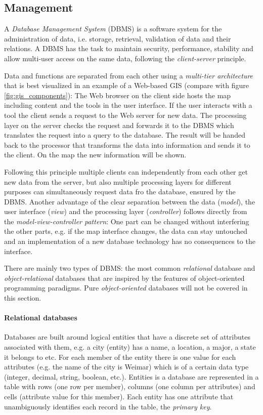

\subsection{Management} %
\label{ssub:management}

A \emph{Database Management System} (DBMS) is a software system for the administration of data, i.e. storage, retrieval, validation of data and their relations. A DBMS has the task to maintain security, performance, stability and allow multi-user access on the same data, following the \emph{client-server} principle.

Data and functions are separated from each other using a \emph{multi-tier architecture} that is best visualized in an example of a Web-based GIS (compare with figure \ref{fig:gis_components}): The Web browser on the client side hosts the map including content and the tools in the user interface. If the user interacts with a tool the client sends a request to the Web server for new data. The processing layer on the server checks the request and forwards it to the DBMS which translates the request into a query to the database. The result will be handed back to the processor that transforms the data into information and sends it to the client. On the map the new information will be shown.

Following this principle multiple clients can independently from each other get new data from the server, but also multiple processing layers for different purposes can simultaneously request data fro the database, ensured by the DBMS. Another advantage of the clear separation between the data (\emph{model}), the user interface (\emph{view}) and the processing layer (\emph{controller}) follows directly from the \emph{model-view-controller pattern}: One part can be changed without interfering the other parts, e.g. if the map interface changes, the data can stay untouched and an implementation of a new database technology has no consequences to the interface.

There are mainly two types of DBMS: the most common \emph{relational} database and \emph{object-relational} databases that are inspired by the features of object-oriented programming paradigms. Pure \emph{object-oriented} databases will not be covered in this section.

\paragraph{Relational databases} %
\label{par:relational_databases}
Databases are built around logical entities that have a discrete set of attributes associated with them, e.g. a city (entity) has a name, a location, a major, a state it belongs to etc. For each member of the entity there is one value for each attributes (e.g. the name of the city is Weimar) which is of a certain data type (integer, decimal, string, boolean, etc.). Entities is a database are represented in a table with rows (one row per member), columns (one column per attributes) and cells (attribute value for this member). Each entity has one attribute that unambiguously identifies each record in the table, the \emph{primary key}.

